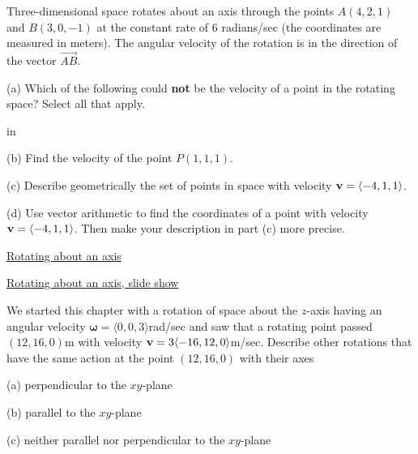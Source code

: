 \documentclass{ximera}
\newcommand{\pskip}{\vskip 0.1 in}
\begin{document}
\begin{question} \label{Qgdsnt:Cross}
Three-dimensional space rotates about an axis through the points $A(4,2,1)$ and $B(3,0,-1)$ at the constant rate of $6$ radians/sec (the coordinates are measured in meters). The angular velocity of the rotation is in the direction of the vector $\overrightarrow{AB}$. 

(a) Which of the following could {\bf not} be the velocity of a point in the rotating space? Select all that apply.

\begin{selectAll}  
  \end{selectAll}  


\pskip

(b) Find the velocity of the point $P(1,1,1)$.

(c) Describe geometrically the set of points in space with velocity ${\bf v} =\langle -4,1,1 \rangle$.

(d) Use vector arithmetic to find the coordinates of a point with velocity ${\bf v} =\langle -4,1,1 \rangle$. Then make your description in part (c) more precise.

\end{question}


\begin{exploration}



\href{https://www.desmos.com/3d/31f1fd3ffd}{Rotating about an axis}


\href{https://www.desmos.com/3d/a82ef238da}{Rotating about an axis, slide show}


\end{exploration}



\begin{question}  \label{Q3254hv:Cross}
We started this chapter with a rotation of space about the $z$-axis having an angular velocity $\boldsymbol{\omega} = \langle 0,0,3 \rangle$rad/sec and saw that a rotating point passed $(12,16,0)$m with velocity ${\bf v}= 3\langle -16,12,0\rangle$m/sec. Describe other rotations that have the same action at the point $(12,16,0)$ with their axes

(a) perpendicular to the $xy$-plane

(b) parallel to the $xy$-plane

(c) neither parallel nor perpendicular to the $xy$-plane
 
\end{question}
\end{document}

